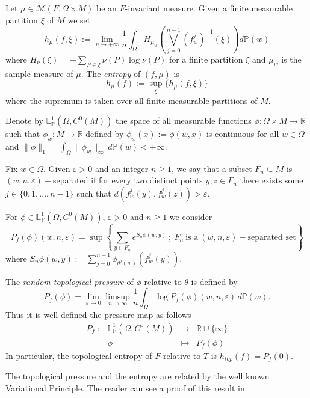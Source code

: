 \documentclass[12pt,a4paper]{amsart}
\theoremstyle{plain}
\begin{document}
	
	
	Let $\mu\in \mathcal{M}(F, \Omega\times M)$ be an $F$-invariant measure. Given a finite measurable partition $\xi$ of $M$ we set 
	$$h_{\mu}(f, \xi):=\lim_{n\rightarrow +\infty} \frac{1}{n} \int_\Omega H_{\mu_w}\left(\bigvee_{j=0}^{n-1}(f_{w}^{j})^{-1}(\xi)\right) d\mathbb{P}(w)$$
	where $H_{\nu}(\xi)=-\sum_{P\in \xi}\nu(P)\log\nu(P)$ for a finite partition $\xi$ and $\mu_w$ is the sample measure of $\mu.$
	The \emph{entropy} of $(f, \mu)$ is $$h_{\mu}(f):=\sup_{\xi}\{h_{\mu}(f,\xi)\}
	$$
	where the supremum is taken over all finite measurable partitions of $M$.
	
	Denote by $\mathbb{L}^{1}_{\mathbb{P}}(\Omega,C^0(M))$ the space of all measurable functions  $\phi:\Omega\times M\rightarrow \mathbb{R}$ such that $\phi_{w}:M\rightarrow \mathbb{R}$ defined by $\phi_{w}(x):=\phi(w,x)$ is continuous for all $w\in \Omega$ and $\lVert \phi \rVert_{1}=\int_{\Omega}\lVert \phi_{w}\rVert_{\infty}\,d\mathbb{P}(w)<+\infty$. 
	
	Fix $w\in \Omega$. Given $\varepsilon >0$ and an integer $n\geq 1$, we say that a subset $F_n\subseteq M$ is $(w,n,\varepsilon)-$separated if for every two distinct points $y,z\in F_n$ there exists some $j\in \{0,1,...,n-1\}$ such that $d(f^{j}_{w}(y),f^{j}_{w}(z))>\varepsilon$. 
	
	For $\phi \in  \mathbb{L}^{1}_{\mathbb{P}}(\Omega,C^0(M))$, $\varepsilon >0$ and $n\geq 1$ we consider 
	$$P_{f}(\phi)(w, n, \varepsilon)= \sup\left\{\sum_{y\in F_n}e^{ S_{n}\phi(w,y)} \ ;\ F_n\  \mbox{is a}\ (w,n,\varepsilon)-\mbox{separated set}\right\}$$
	where $S_{n}\phi(w,y):=\sum^{n-1}_{j=0}\phi_{\theta^{j}(w)}( f^{j}_{w}(y))$.
	
	The \emph{random topological pressure} of $\phi$ relative to $\theta$ is defined by	 
	$$P_{f}(\phi)=\lim_{\varepsilon\rightarrow 0}\limsup_{n\rightarrow \infty} \frac{1}{n}\int_{\Omega}\log P_{f}(\phi)(w, n, \varepsilon)\, d\mathbb{P}(w).$$
	Thus it is well defined the pressure map as follows
	$$
	\begin{array}{cccc}
		P_{f}\ : & \! \mathbb{L}^{1}_{\mathbb{P}}(\Omega,C^0(M)) & \! \longrightarrow
		& \!\mathbb{R}\cup\{\infty\} \\
		& \! \phi & \! \longmapsto	 & \! P_{f}(\phi)
	\end{array}
	$$ 
	In particular, the topological entropy of $F$ relative to $T$ is $h_{top}(f)=P_{f}(0)$.	
	
	The topological pressure and the entropy are related by the well known Variational Principle. The reader can see a proof of this result in \cite{L}.  
	
\end{document}

